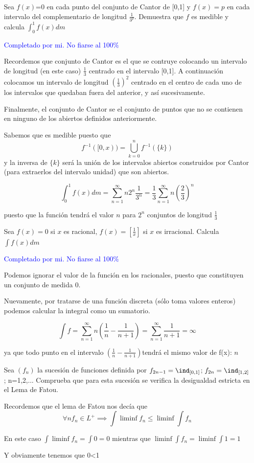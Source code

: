 \begin{problem}[2]
Sea $f(x)$=0 en cada punto del conjunto de Cantor de [0,1] y $f(x)=p$ en cada intervalo del complementario de longitud $\frac{1}{3^p}$. Demuestra que $f$ es medible y calcula $\int_0^1f(x)dm$

\solution
\textcolor{blue}{Completado por mi. No fiarse al 100\%}

Recordemos que conjunto de Cantor es el que se contruye colocando un intervalo de longitud (en este caso) $\frac{1}{3}$ centrado en el intervalo [0,1]. A continuación colocamos un intervalo de longitud $\left(\frac{1}{3}\right)^2$ centrado en el centro de cada uno de los intervalos que quedaban fuera del anterior, y así sucesivamente.

Finalmente, el conjunto de Cantor se el conjunto de puntos que no se contienen en ninguno de los abiertos definidos anteriormente.

Sabemos que es medible puesto que
\[f^{-1}([0, x)) = \bigcup_{k=0}^nf^{-1}(\{k\})\]
y la inversa de $\{k\}$ será la unión de los intervalos abiertos construidos por Cantor (para extraerlos del intervalo unidad) que son abiertos.

\[\int_0^1 f(x)dm= \sum_{n=1}^{\infty}n2^n\frac{1}{3^n} = \frac{1}{3}\sum_{n=1}^{\infty} n \left(\frac{2}{3}\right)^n\]

puesto que la función tendrá el valor $n$ para $2^n$ conjuntos de longitud $\frac{1}{3}$
\end{problem}

\begin{problem}[3]
Sea $f(x) = 0$ si $x$ es racional, $f(x)=[\frac{1}{x}]$ si $x$ es irracional. Calcula $\int f(x)dm$

\solution
\textcolor{blue}{Completado por mi. No fiarse al 100\%}

Podemos ignorar el valor de la función en los racionales, puesto que constituyen un conjunto de medida 0.

Nuevamente, por tratarse de una función discreta (sólo toma valores enteros) podemos calcular la integral como un sumatorio.

\[\int f = \sum_{n=1}^{\infty} n \left( \frac{1}{n}-\frac{1}{n+1}\right)= \sum_{n=1}^{\infty} \frac{1}{n+1} = \infty\]

ya que todo punto en el intervalo $\left( \frac{1}{n}-\frac{1}{n+1}\right)$tendrá el mismo valor de f(x): $n$

\end{problem}

\begin{problem}[4]
Sea $(f_n)$ la sucesión de funciones definida por $f_{2n-1}=\ind_{[0,1]}$; $f_{2n}=\ind_{[1,2]}$; n=1,2,... Comprueba que para esta sucesión se verifica la desigualdad estricta en el Lema de Fatou.

\solution

Recordemos que el lema de Fatou nos decía que
\[\forall n f_n \in L^+ \implies \int \liminf f_n \leq \liminf \int f_n\]

En este caso $\int \liminf f_n = \int 0 = 0$ mientras que $\liminf \int f_n = \liminf \int 1 = 1$

Y obviamente tenemos que 0<1
\end{problem}

